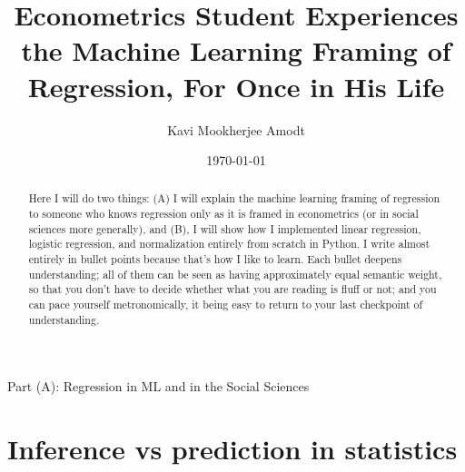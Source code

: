 \documentclass[11pt]{article}
\title{Econometrics Student Experiences the Machine Learning Framing of Regression, For Once in His Life}
\author{Kavi Mookherjee Amodt}
\date{\today}
\begin{document}
\maketitle

\begin{abstract}
Here I will do two things: (A) I will explain the machine learning framing of regression 
to someone who knows regression only as it is framed in econometrics (or in social sciences more generally), 
and (B), I will show how I implemented linear regression, logistic regression, and normalization 
entirely from scratch in Python. I write almost entirely in bullet points because that's how I like to learn. Each bullet deepens understanding; all of them can be seen as having approximately equal semantic weight, so that you don't have to decide whether what you are reading is fluff or not; and you can pace yourself metronomically, it being easy to return to your last checkpoint of understanding. 
\end{abstract}

\vspace{0.5cm}

{\huge Part (A): Regression in ML and in the Social Sciences}

\section{Inference vs prediction in statistics}\label{sec:cultures}
\end{document}
